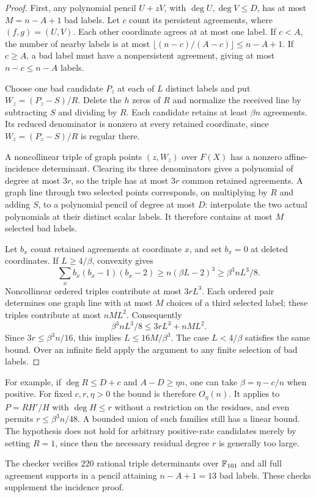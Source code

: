 \begin{proof}
First, any polynomial pencil $U+zV$, with $\deg U,\deg V\le D$, has
at most $M=n-A+1$ bad labels. Let $c$ count its persistent agreements,
where $(f,g)=(U,V)$. Each other coordinate agrees at at most one label.
If $c<A$, the number of nearby labels is at most
$\lfloor(n-c)/(A-c)\rfloor\le n-A+1$.
If $c\ge A$, a bad label must have a nonpersistent agreement, giving
at most $n-c\le n-A$ labels.

Choose one bad candidate $P_z$ at each of $L$ distinct labels and put
$W_z=(P_z-S)/R$. Delete the $h$ zeros of $R$ and normalize the received
line by subtracting $S$ and dividing by $R$. Each candidate retains at
least $\beta n$ agreements. Its reduced denominator is nonzero at every
retained coordinate, since $W_z=(P_z-S)/R$ is regular there.

A noncollinear triple of graph points $(z,W_z)$ over $F(X)$ has a
nonzero affine-incidence determinant. Clearing its three denominators
gives a polynomial of degree at most $3r$, so the triple has at most
$3r$ common retained agreements. A graph line through two selected
points corresponds, on multiplying by $R$ and adding $S$, to a
polynomial pencil of degree at most $D$: interpolate the two actual
polynomials at their distinct scalar labels. It therefore contains at
most $M$ selected bad labels.

Let $b_x$ count retained agreements at coordinate $x$, and set $b_x=0$
at deleted coordinates. If $L\ge4/\beta$, convexity gives
\[
 \sum_x b_x(b_x-1)(b_x-2)
 \ge n(\beta L-2)^3\ge\beta^3nL^3/8.
\]
Noncollinear ordered triples contribute at most $3rL^3$. Each ordered
pair determines one graph line with at most $M$ choices of a third
selected label; these triples contribute at most $nML^2$. Consequently
\[
 \beta^3nL^3/8\le3rL^3+nML^2.
\]
Since $3r\le\beta^3n/16$, this implies $L\le16M/\beta^3$.
The case $L<4/\beta$ satisfies the same bound. Over an infinite field
apply the argument to any finite selection of bad labels.
\end{proof}

For example, if $\deg R\le D+c$ and $A-D\ge\eta n$, one can take
$\beta=\eta-c/n$ when positive. For fixed $c,r,\eta>0$ the bound is
therefore $O_\eta(n)$. It applies to $P=RH'/H$ with $\deg H\le r$
without a restriction on the residues, and even permits
$r\le\beta^3n/48$. A bounded union of such families still has a linear
bound. The hypothesis does not hold for arbitrary positive-rate
candidates merely by setting $R=1$, since then the necessary residual
degree $r$ is generally too large.

The checker 
verifies $220$ rational triple determinants over $\mathbb F_{101}$ and all
full agreement supports in a pencil attaining $n-A+1=13$ bad labels.
These checks supplement the incidence proof.
